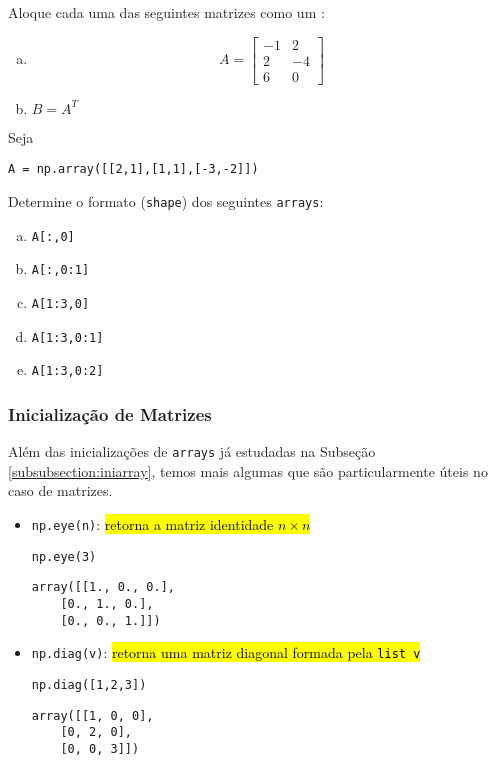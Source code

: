 \begin{exr}
  Aloque cada uma das seguintes matrizes como um {\PYTHONnumpyDOTarray}:
  \begin{enumerate}[a)]
  \item
    \begin{equation}
      A =
      \begin{bmatrix}
        -1 & 2\\
        2 & -4\\
        6 & 0
      \end{bmatrix}
    \end{equation}
  \item $B = A^T$ 
  \end{enumerate}
\end{exr}

\begin{exr}
  Seja

\begin{lstlisting}
A = np.array([[2,1],[1,1],[-3,-2]])
\end{lstlisting}

  Determine o formato (\texttt{shape}) dos seguintes \texttt{arrays}:
  \begin{enumerate}[a)]
  \item \texttt{A[:,0]}
  \item \texttt{A[:,0:1]}
  \item \texttt{A[1:3,0]}
  \item \texttt{A[1:3,0:1]}
  \item \texttt{A[1:3,0:2]}
  \end{enumerate}
\end{exr}

\subsubsection{Inicialização de Matrizes}

Além das inicializações de \texttt{arrays} já estudadas na Subseção \ref{subsubsection:iniarray}, temos mais algumas que são particularmente úteis no caso de matrizes.
\begin{itemize}
\item \texttt{np.eye(n)}: \hl{retorna a matriz identidade $n\times n$}

\begin{lstlisting}
np.eye(3)
\end{lstlisting}

\begin{verbatim}
array([[1., 0., 0.],
    [0., 1., 0.],
    [0., 0., 1.]])
\end{verbatim}

   \item \texttt{np.diag(v)}: \hl{retorna uma matriz diagonal formada pela \texttt{list v}}

\begin{lstlisting}
np.diag([1,2,3])
\end{lstlisting}

\begin{verbatim}
array([[1, 0, 0],
    [0, 2, 0],
    [0, 0, 3]])
\end{verbatim}

  \end{itemize}

